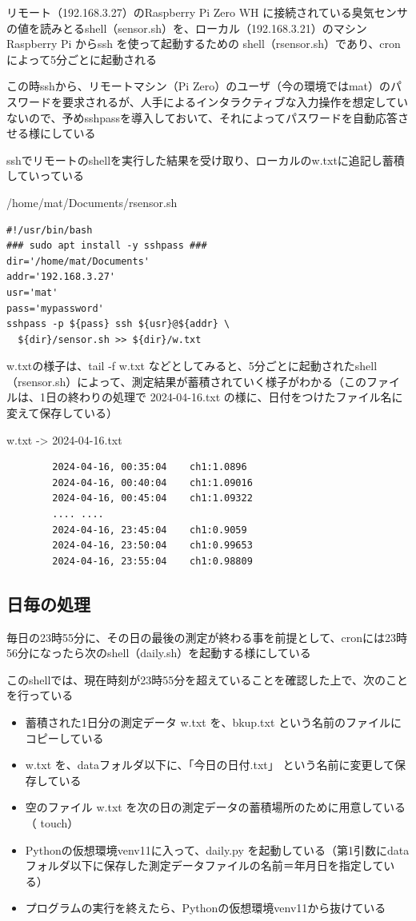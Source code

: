 \documentclass[12pt,a4paper,uplatex]{jsarticle}
\begin{document}
リモート（192.168.3.27）のRaspberry Pi Zero WH に接続されている臭気センサの値を読みとるshell（sensor.sh）を、ローカル（192.168.3.21）のマシンRaspberry Pi からssh を使って起動するための shell（rsensor.sh）であり、cronによって5分ごとに起動される

この時sshから、リモートマシン（Pi Zero）のユーザ（今の環境ではmat）のパスワードを要求されるが、人手によるインタラクティブな入力操作を想定していないので、予めsshpassを導入しておいて、それによってパスワードを自動応答させる様にしている

sshでリモートのshellを実行した結果を受け取り、ローカルのw.txtに追記し蓄積していっている

\begin{itembox}[l]{/home/mat/Documents/rsensor.sh}
	\begin{verbatim}
#!/usr/bin/bash
### sudo apt install -y sshpass ###
dir='/home/mat/Documents'
addr='192.168.3.27'
usr='mat'
pass='mypassword'
sshpass -p ${pass} ssh ${usr}@${addr} \
  ${dir}/sensor.sh >> ${dir}/w.txt
	\end{verbatim}
\end{itembox}

w.txtの様子は、tail -f w.txt などとしてみると、5分ごとに起動されたshell（rsensor.sh）によって、測定結果が蓄積されていく様子がわかる（このファイルは、1日の終わりの処理で 2024-04-16.txt の様に、日付をつけたファイル名に変えて保存している）

\begin{itembox}[l]{w.txt -> 2024-04-16.txt}
	\begin{verbatim}
		2024-04-16, 00:35:04	ch1:1.0896
		2024-04-16, 00:40:04	ch1:1.09016
		2024-04-16, 00:45:04	ch1:1.09322
		.... ....
		2024-04-16, 23:45:04	ch1:0.9059
		2024-04-16, 23:50:04	ch1:0.99653
		2024-04-16, 23:55:04	ch1:0.98809
	\end{verbatim}
\end{itembox}

\subsection{日毎の処理}

毎日の23時55分に、その日の最後の測定が終わる事を前提として、cronには23時56分になったら次のshell（daily.sh）を起動する様にしている

このshellでは、現在時刻が23時55分を超えていることを確認した上で、次のことを行っている
\begin{itemize}
	\item 蓄積された1日分の測定データ w.txt を、bkup.txt という名前のファイルにコピーしている
	\item w.txt を、dataフォルダ以下に、「今日の日付.txt」 という名前に変更して保存している
	\item 空のファイル w.txt を次の日の測定データの蓄積場所のために用意している（ touch）
	\item Pythonの仮想環境venv11に入って、daily.py を起動している（第1引数にdataフォルダ以下に保存した測定データファイルの名前＝年月日を指定している）
	\item プログラムの実行を終えたら、Pythonの仮想環境venv11から抜けている
\end{itemize}
\end{document}
